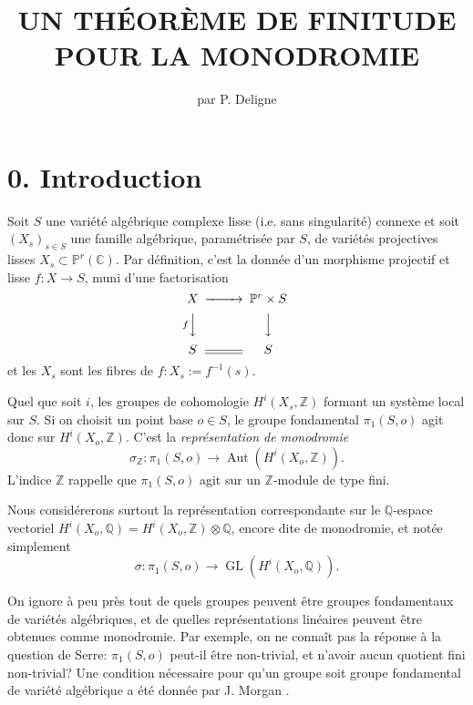 \documentclass[12pt,a4paper]{article}
\title{\textbf{UN TH\'{E}OR\`{E}ME DE FINITUDE POUR LA MONODROMIE}}
\author{par P. Deligne}
\date{}
\theoremstyle{plain}
\theoremstyle{definition}
\DeclareMathOperator{\Aut}{Aut}
\DeclareMathOperator{\GL}{GL}
\newcommand{\CC}{\mathbb{C}}
\newcommand{\QQ}{\mathbb{Q}}
\newcommand{\ZZ}{\mathbb{Z}}
\newcommand{\PP}{\mathbb{P}}
\begin{document}
\maketitle

\section*{0. Introduction}

Soit $S$ une vari\'{e}t\'{e} alg\'{e}brique complexe lisse (i.e. sans singularit\'{e}) connexe et soit $(X_{s})_{s \in S}$ une famille alg\'{e}brique, param\'{e}tris\'{e}e par $S$, de vari\'{e}t\'{e}s projectives lisses $X_{s} \subset \PP^{r}(\CC)$. Par d\'{e}finition, c'est la donn\'{e}e d'un morphisme projectif et lisse $f: X \to S$, muni d'une factorisation
\[
\begin{CD}
X @>>> \PP^{r} \times S \\
@V{f}VV @VVV \\
S @= S
\end{CD}
\]
et les $X_{s}$ sont les fibres de $f : X_{s} := f^{-1}(s)$.

Quel que soit $i$, les groupes de cohomologie $H^{i}(X_{s}, \ZZ)$ formant un syst\`{e}me local sur $S$. Si on choisit un point base $o \in S$, le groupe fondamental $\pi_{1}(S,o)$ agit donc sur $H^{i}(X_{o}, \ZZ)$. C'est la \emph{repr\'{e}sentation de monodromie}
\[
\sigma_{\ZZ} : \pi_{1}(S,o) \to \Aut(H^{i}(X_{o}, \ZZ)).
\]
L'indice $\ZZ$ rappelle que $\pi_{1}(S,o)$ agit sur un $\ZZ$-module de type fini.

Nous consid\'{e}rerons surtout la repr\'{e}sentation correspondante sur le $\QQ$-espace vectoriel $H^{i}(X_{o}, \QQ) = H^{i}(X_{o}, \ZZ) \otimes \QQ$, encore dite de monodromie, et not\'{e}e simplement
\[
\sigma : \pi_{1}(S,o) \to \GL(H^{i}(X_{o}, \QQ)).
\]

On ignore \`{a} peu pr\`{e}s tout de quels groupes peuvent \^{e}tre groupes fondamentaux de vari\'{e}t\'{e}s alg\'{e}briques, et de quelles repr\'{e}sentations lin\'{e}aires peuvent \^{e}tre obtenues comme monodromie. Par exemple, on ne conna\^{i}t pas la r\'{e}ponse \`{a} la question de Serre: $\pi_{1}(S,o)$ peut-il \^{e}tre non-trivial, et n'avoir aucun quotient fini non-trivial? Une condition n\'{e}cessaire pour qu'un groupe soit groupe fondamental de vari\'{e}t\'{e} alg\'{e}brique a \'{e}t\'{e} donn\'{e}e par J. Morgan \cite{Morgan}.
\end{document}
